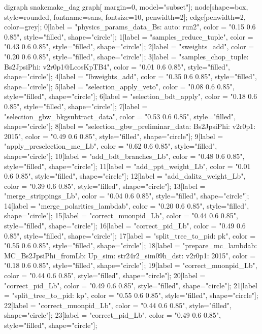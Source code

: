 digraph snakemake_dag {
    graph[ margin=0, model="subset"];
    node[shape=box, style=rounded, fontname=sans,                 fontsize=10, penwidth=2];
    edge[penwidth=2, color=grey];
	0[label = "physics_params_data_Bs\nfit: auto\nyear: run2", color = "0.15 0.6 0.85", style="filled", shape="circle"];
	1[label = "samples_reduce_tuple", color = "0.43 0.6 0.85", style="filled", shape="circle"];
	2[label = "sweights_add", color = "0.20 0.6 0.85", style="filled", shape="circle"];
	3[label = "samples_chop_tuple\nmode: Bs2JpsiPhi\nversion: v2r0p1@LcosKpTB4", color = "0.01 0.6 0.85", style="filled", shape="circle"];
	4[label = "lbweights_add", color = "0.35 0.6 0.85", style="filled", shape="circle"];
	5[label = "selection_apply_veto", color = "0.08 0.6 0.85", style="filled", shape="circle"];
	6[label = "selection_bdt_apply", color = "0.18 0.6 0.85", style="filled", shape="circle"];
	7[label = "selection_gbw_bkgsubtract_data", color = "0.53 0.6 0.85", style="filled", shape="circle"];
	8[label = "selection_gbw_preliminar_data\nmode: Bs2JpsiPhi\nversion: v2r0p1\nyear: 2015", color = "0.49 0.6 0.85", style="filled", shape="circle"];
	9[label = "apply_preselection_mc_Lb", color = "0.62 0.6 0.85", style="filled", shape="circle"];
	10[label = "add_bdt_branches_Lb", color = "0.48 0.6 0.85", style="filled", shape="circle"];
	11[label = "add_ppt_weight_Lb", color = "0.01 0.6 0.85", style="filled", shape="circle"];
	12[label = "add_dalitz_weight_Lb", color = "0.39 0.6 0.85", style="filled", shape="circle"];
	13[label = "merge_strippings_Lb", color = "0.04 0.6 0.85", style="filled", shape="circle"];
	14[label = "merge_polarities_lambdab", color = "0.20 0.6 0.85", style="filled", shape="circle"];
	15[label = "correct_muonpid_Lb", color = "0.44 0.6 0.85", style="filled", shape="circle"];
	16[label = "correct_pid_Lb", color = "0.49 0.6 0.85", style="filled", shape="circle"];
	17[label = "split_tree_to_pid\npkkp: pk", color = "0.55 0.6 0.85", style="filled", shape="circle"];
	18[label = "prepare_mc_lambdab\nmode: MC_Bs2JpsiPhi_fromLb\npolarity: Up\nstrip_sim: str24r2_sim09h_dst\nversion: v2r0p1\nyear: 2015", color = "0.18 0.6 0.85", style="filled", shape="circle"];
	19[label = "correct_muonpid_Lb", color = "0.44 0.6 0.85", style="filled", shape="circle"];
	20[label = "correct_pid_Lb", color = "0.49 0.6 0.85", style="filled", shape="circle"];
	21[label = "split_tree_to_pid\npkkp: kp", color = "0.55 0.6 0.85", style="filled", shape="circle"];
	22[label = "correct_muonpid_Lb", color = "0.44 0.6 0.85", style="filled", shape="circle"];
	23[label = "correct_pid_Lb", color = "0.49 0.6 0.85", style="filled", shape="circle"];
}
